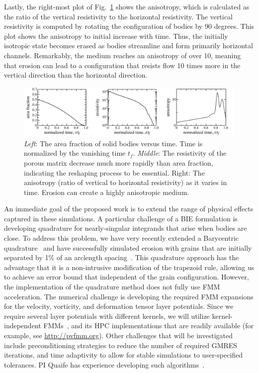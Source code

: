 \documentclass[11pt]{article}
\begin{document}
Lastly, the right-most plot of Fig.~\ref{fig3} shows the anisotropy, which is calculated as the ratio of the vertical resistivity to the horizontal resistivity. The vertical resistivity is computed by rotating the configuration of bodies by 90 degrees. This plot shows the anisotropy to initial increase with time. Thus, the initially isotropic state becomes erased as bodies streamline and form primarily horizontal channels. Remarkably, the medium reaches an anisotropy of over 10, meaning that erosion can lead to a configuration that resists flow 10 times more in the vertical direction than the horizontal direction.

\begin{figure}[htp]
\begin{center}
\includegraphics[width = 0.99 \textwidth]{./figs/fig3.pdf}
  \caption{\label{fig3} {\em Left}: The area fraction of solid bodies versus time. Time is normalized by the vanishing time $t_f$. {\em Middle}: The resistivity of the porous matrix decrease much more rapidly than area fraction, indicating the reshaping process to be essential. Right: The anisotropy (ratio of vertical to horizontal resistivity) as it varies in time. Erosion can create a highly anisotropic medium.}
\end{center}
\end{figure}

{An immediate goal of the proposed work is to extend the range of physical effects captured in these simulations.} A particular challenge of a BIE formulation is developing quadrature for nearly-singular integrands that arise when bodies are close. To address this problem, we have very recently extended a Barycentric quadrature~\cite{bar2014, bar-wu-vee2015} and have successfully simulated erosion with grains that are initially separated by 1\% of an arclength spacing~\cite{chi-moo-qua2019}. This quadrature approach has the advantage that it is a non-intrusive modification of the trapezoid rule, allowing us to achieve an error bound that independent of the grain configuration. However, the implementation of the quadrature method does not fully use FMM acceleration. The numerical challenge is developing the required FMM expansions for the velocity, vorticity, and deformation tensor layer potentials. Since we require several layer potentials with different kernels, we will utilize kernel-independent FMMs~\cite{yin-bir-zor2004, fon-dar2009}, and its HPC implementations that are readily available (for example, see \url{http://pvfmm.org}). Other challenges that will be investigated include preconditioning strategies to reduce the number of required GMRES iterations, and time adaptivity to allow for stable simulations to user-specified tolerances. PI Quaife has experience developing such algorithms~\cite{qua-bir2015b, qua-bir2016, qua-bir2015a, qua-cou-dar2018}.
\end{document}
